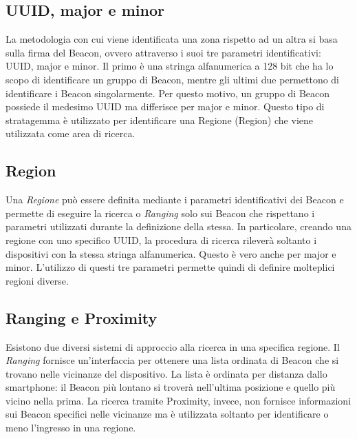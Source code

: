 \subsection{UUID, major e minor}\vspace{5mm}

La metodologia con cui viene identificata una zona rispetto ad un altra si basa sulla firma del Beacon, ovvero attraverso i suoi tre parametri identificativi: UUID, major e minor. Il primo è una stringa alfanumerica a 128 bit che ha lo scopo di identificare un gruppo di Beacon, mentre gli ultimi due permettono di identificare i Beacon singolarmente. Per questo motivo, un gruppo di Beacon possiede il medesimo UUID ma differisce per major e minor. Questo tipo di stratagemma è utilizzato per identificare una Regione (Region) che viene utilizzata come area di ricerca.\vspace{5mm}

\subsection{Region}\vspace{5mm}

Una \emph{Regione} può essere definita mediante i parametri identificativi dei Beacon e permette di eseguire la ricerca o \emph{Ranging} solo sui Beacon che rispettano i parametri utilizzati durante la definizione della stessa. In particolare, creando una regione con uno specifico UUID, la procedura di ricerca rileverà soltanto i dispositivi con la stessa stringa alfanumerica. Questo è vero anche per major e minor. L'utilizzo di questi tre parametri permette quindi di definire molteplici regioni diverse.

\subsection{Ranging e Proximity}\vspace{5mm}

Esistono due diversi sistemi di approccio alla ricerca in una specifica regione. Il \emph{Ranging} fornisce un'interfaccia per ottenere una lista ordinata di Beacon che si trovano nelle vicinanze del dispositivo. La lista è ordinata per distanza dallo smartphone: il Beacon più lontano si troverà nell'ultima posizione e quello più vicino nella prima. La ricerca tramite Proximity, invece, non fornisce informazioni sui Beacon specifici nelle vicinanze ma è utilizzata soltanto per identificare o meno l'ingresso in una regione.\vspace{5mm} 

